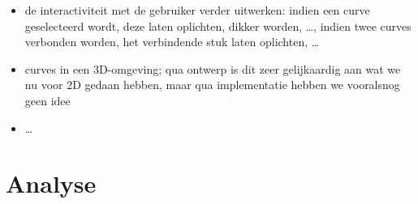 \documentclass[a4paper,11pt,oneside, titlepage]{article}
\begin{document}
\begin{itemize}
\begin{itemize}
\begin{itemize}
\item Soundmixer: de curve, of curves voor meerdere instrumenten bijvoorbeeld, stelt dan een tijdslijn voor. De X-as wordt dan van links naar rechts doorlopen, en hoe hoger de corresponderende Y-waarde op dat moment, hoe hoger de toon die men te horen krijgt.
\item Transformer: we geven een afbeelding en laten die weergeven. De gebruiker plaatst een aantal punten in het vlak, en alnaargelang hij ze nadien versleept, vervormt de afbeelding. Ons lijkt dit het moeilijkst van al te implementeren, maar niet z\'o onoverkomelijk. 
\item Curving: we geven een afbeelding in, en krijgen een curve-variant van die afbeelding terug. Elke lijn op de afbeelding wordt dus omgezet in \'e\'en of andere curve en weergegeven.
\item \ldots
\end{itemize}
\item de interactiviteit met de gebruiker verder uitwerken: indien een curve geselecteerd wordt, deze laten oplichten, dikker worden, \ldots, indien twee curves verbonden worden, het verbindende stuk laten oplichten, \ldots
\item curves in een 3D-omgeving; qua ontwerp is dit zeer gelijkaardig aan wat we nu voor 2D gedaan hebben, maar qua implementatie hebben we vooralsnog geen idee
\item \ldots
\end{itemize}
\end{itemize}

\section{Analyse}
\end{document}
